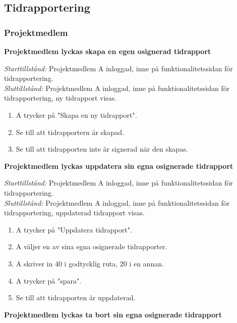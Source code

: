 \documentclass[a4paper]{article}
\begin{document}
\subsection{Tidrapportering}

\subsubsection{Projektmedlem}

\begin{FT}


\item
\textbf{Projektmedlem lyckas skapa en egen osignerad tidrapport}

\emph{Starttillstånd:} Projektmedlem A inloggad, inne på funktionalitetssidan för tidrapportering.\\
\emph{Sluttillstånd:} Projektmedlem A inloggad, inne på funktionalitetssidan för tidrapportering, ny tidrapport visas.

\begin{enumerate}
\item A trycker på "Skapa en ny tidrapport".
\item Se till att tidrapportern är skapad.
\item Se till att tidrapporten inte är signerad när den skapas.
\end{enumerate}

\item
\textbf{Projektmedlem lyckas uppdatera sin egna osignerade tidrapport}

\emph{Starttillstånd:} Projektmedlem A inloggad, inne på funktionalitetssidan för tidrapportering.\\
\emph{Sluttillstånd:} Projektmedlem A inloggad, inne på funktionalitetssidan för tidrapportering, uppdaterad tidrapport visas.

\begin{enumerate}
\item A trycker på "Uppdatera tidrapport".
\item A väljer en av sina egna osignerade tidrapporter.
\item A skriver in 40 i godtycklig ruta, 20 i en annan.
\item A trycker på "spara".
\item Se till att tidrapporten är uppdaterad.
\end{enumerate}

\item
\textbf{Projektmedlem lyckas ta bort sin egna osignerade tidrapport}


\end{FT}
\end{document}
